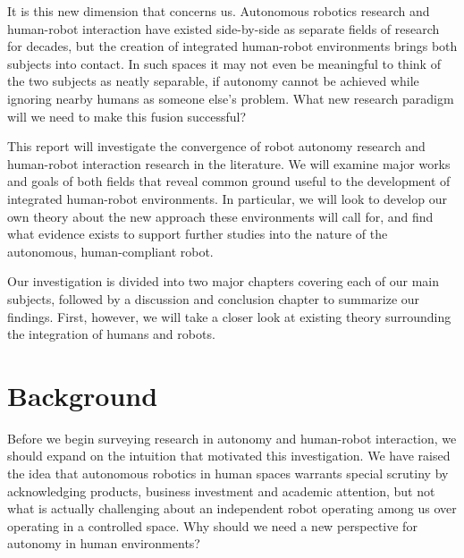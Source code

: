 \documentclass{sfuthesis}
\begin{document}
It is this new dimension that concerns us. Autonomous robotics research and human-robot interaction have existed side-by-side as separate fields of research for decades, but the creation of integrated human-robot environments brings both subjects into contact. In such spaces it may not even be meaningful to think of the two subjects as neatly separable, if autonomy cannot be achieved while ignoring nearby humans as someone else's problem. What new research paradigm will we need to make this fusion successful?

This report will investigate the convergence of robot autonomy research and human-robot interaction research in the literature. We will examine major works and goals of both fields that reveal common ground useful to the development of integrated human-robot environments. In particular, we will look to develop our own theory about the new approach these environments will call for, and find what evidence exists to support further studies into the nature of the autonomous, human-compliant robot.

Our investigation is divided into two major chapters covering each of our main subjects, followed by a discussion and conclusion chapter to summarize our findings. First, however, we will take a closer look at existing theory surrounding the integration of humans and robots.










\section{Background}


Before we begin surveying research in autonomy and human-robot interaction, we should expand on the intuition that motivated this investigation. We have raised the idea that autonomous robotics in human spaces warrants special scrutiny by acknowledging products, business investment and academic attention, but not what is actually challenging about an independent robot operating among us over operating in a controlled space. Why should we need a new perspective for autonomy in human environments?
\end{document}
